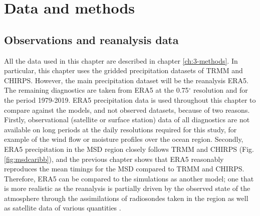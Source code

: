 






\section{Data and methods}

\subsection{Observations and reanalysis data}

All the data used in this chapter are described in chapter \ref{ch:3-methods}. In particular, this chapter uses the gridded precipitation datasets of TRMM and CHIRPS. However, the main precipitation dataset will be the reanalysis ERA5. The remaining diagnostics are taken from ERA5 at the 0.75$^\circ$ resolution and for the period 1979-2019. ERA5 precipitation data is used throughout this chapter to compare against the models, and not observed datasets, because of two reasons. Firstly, observational (satellite or surface station) data of all diagnostics are not available on long periods at the daily resolutions required for this study, for example of the wind flow or moisture profiles over the ocean region. Secondly, ERA5 precipitation in the MSD region closely follows TRMM and CHIRPS (Fig. \ref{fig:msdcaribb}), and the previous chapter shows that ERA5 reasonably reproduces the mean timings for the MSD compared to TRMM and CHIRPS. Therefore, ERA5 can be compared to the simulations as another model; one that is more realistic as the reanalysis is partially driven by the observed state of the atmosphere through the assimilations of radiosondes taken in the region as well as satellite data of various quantities \citep{era5hersbach}.

